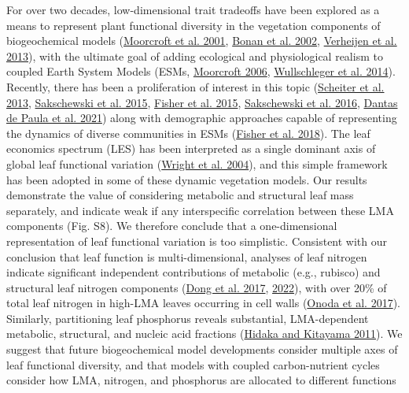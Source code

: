 \documentclass[
  12pt,
  letterpaper,
  DIV=11,
  numbers=noendperiod]{scrartcl}
\begin{document}
For over two decades, low-dimensional trait tradeoffs have been explored
as a means to represent plant functional diversity in the vegetation
components of biogeochemical models
(\protect\hyperlink{ref-Moorcroft2001}{Moorcroft et al. 2001},
\protect\hyperlink{ref-Bonan2002}{Bonan et al. 2002},
\protect\hyperlink{ref-Verheijen2013}{Verheijen et al. 2013}), with the
ultimate goal of adding ecological and physiological realism to coupled
Earth System Models (ESMs,
\protect\hyperlink{ref-Moorcroft2006}{Moorcroft 2006},
\protect\hyperlink{ref-Wullschleger2014}{Wullschleger et al. 2014}).
Recently, there has been a proliferation of interest in this topic
(\protect\hyperlink{ref-Scheiter2013}{Scheiter et al. 2013},
\protect\hyperlink{ref-Sakschewski2015}{Sakschewski et al. 2015},
\protect\hyperlink{ref-Fisher2015}{Fisher et al. 2015},
\protect\hyperlink{ref-Sakschewski2016}{Sakschewski et al. 2016},
\protect\hyperlink{ref-DantasdePaula2021}{Dantas de Paula et al. 2021})
along with demographic approaches capable of representing the dynamics
of diverse communities in ESMs
(\protect\hyperlink{ref-Fisher2018}{Fisher et al. 2018}). The leaf
economics spectrum (LES) has been interpreted as a single dominant axis
of global leaf functional variation
(\protect\hyperlink{ref-Wright2004a}{Wright et al. 2004}), and this
simple framework has been adopted in some of these dynamic vegetation
models. Our results demonstrate the value of considering metabolic and
structural leaf mass separately, and indicate weak if any interspecific
correlation between these LMA components (Fig. S8). We therefore
conclude that a one-dimensional representation of leaf functional
variation is too simplistic. Consistent with our conclusion that leaf
function is multi-dimensional, analyses of leaf nitrogen indicate
significant independent contributions of metabolic (e.g., rubisco) and
structural leaf nitrogen components
(\protect\hyperlink{ref-Dong2017}{Dong et al. 2017},
\protect\hyperlink{ref-Dong2022}{2022}), with over 20\% of total leaf
nitrogen in high-LMA leaves occurring in cell walls
(\protect\hyperlink{ref-Onoda2017}{Onoda et al. 2017}). Similarly,
partitioning leaf phosphorus reveals substantial, LMA-dependent
metabolic, structural, and nucleic acid fractions
(\protect\hyperlink{ref-Hidaka2011}{Hidaka and Kitayama 2011}). We
suggest that future biogeochemical model developments consider multiple
axes of leaf functional diversity, and that models with coupled
carbon-nutrient cycles consider how LMA, nitrogen, and phosphorus are
allocated to different functions
\end{document}
